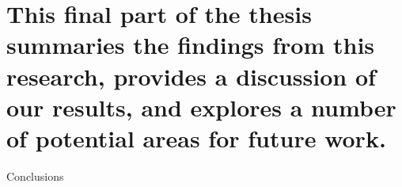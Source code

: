 
\part[Conclusions]{This final part of the thesis summaries the findings from this research, provides a discussion of our results, and explores a number of potential areas for future work.}{Conclusions}\label{part:conclusions}
